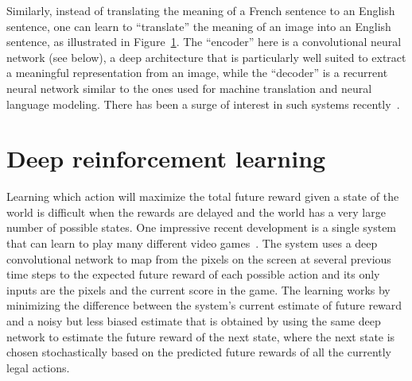 \documentclass[]{article}
\begin{document}
\begin{figure}[ht]
\label{fig:caption-generation}
\end{figure}

Similarly, instead of translating the meaning of a French sentence to an English sentence,
one can learn to ``translate'' the meaning of an image into an English sentence,
as illustrated in Figure~\ref{fig:caption-generation}. The ``encoder'' here is
a convolutional neural network (see below), a deep architecture that is particularly
well suited to extract a meaningful representation from an image, while the ``decoder''
is a recurrent neural network similar to the ones used for machine translation
and neural language modeling. There has been a surge of interest in such
systems recently~\citep{Vinyals-et-al-arxiv2014,OTHER-CAPTION-GENERATION-PAPERS}.


\section{Deep reinforcement learning}

Learning which action will maximize the total future reward given a state
of the world is difficult when the rewards are delayed and the world has a
very large number of possible states. One impressive recent development is
a single system that can learn to play many different video
games~\citep{Deepmind-atari-arxiv2013}. The system uses a deep convolutional network to
map from the pixels on the screen at several previous time steps to the
expected future reward of each possible action and its only inputs are the
pixels and the current score in the game. The learning works by minimizing
the difference between the system's current estimate of future reward and a
noisy but less biased estimate that is obtained by using the same deep
network to estimate the future reward of the next state, where the next
state is chosen stochastically based on the predicted future rewards of all
the currently legal actions.
\end{document}
